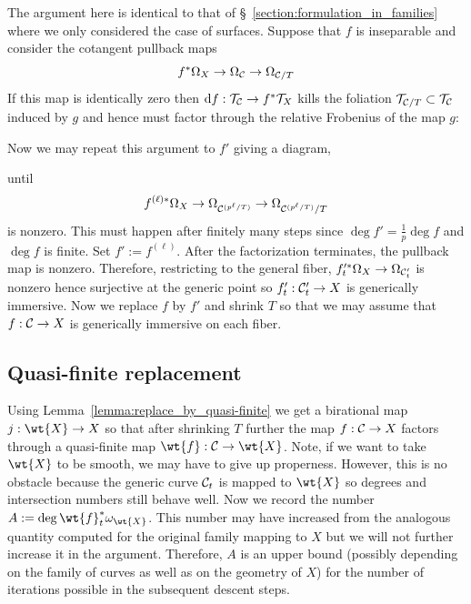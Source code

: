 \documentclass[main.tex]{subfiles}
\begin{document}
{The argument here is identical to that of \S~\ref{section:formulation_in_families} where we only considered the case of surfaces. Suppose that $f$ is inseparable and consider the cotangent pullback maps
\[ f^* \Omega_X \to \Omega_{\mathcal{C}} \to \Omega_{\mathcal{C}/T} \]
If this map is identically zero then $\mathrm{d}{f} : \mathcal{T}_{\mathcal{C}} \to f^* \mathcal{T}_{X}$ kills the foliation $\mathcal{T}_{\mathcal{C}/T} \subset \mathcal{T}_{\mathcal{C}}$ induced by $g$ and hence must factor through the relative Frobenius of the map $g$:
\begin{center}
\end{center}
Now we may repeat this argument to $f'$ giving a diagram,
\begin{center}
\end{center}
until
\[ f^{(\ell)*} \Omega_X \to \Omega_{\mathcal{C}^{(p^{\ell}/T)}} \to \Omega_{\mathcal{C}^{(p^{\ell} / T)}/T} \]
is nonzero. This must happen after finitely many steps since $\deg{f'} = \frac{1}{p} \deg{f}$ and $\deg{f}$ is finite. Set $f' := f^{(\ell)}$. After the factorization terminates, the pullback map is nonzero. Therefore, restricting to the general fiber, $f_t'^* \Omega_X \to \Omega_{\mathcal{C}'_t}$ is nonzero hence surjective at the generic point so $f'_t : \mathcal{C}'_t \to X$ is generically immersive. 
Now we replace $f$ by $f'$ and shrink $T$ so that we may assume that $f : \mathcal{C} \to X$ is generically immersive on each fiber.

\subsection{Quasi-finite replacement}

Using Lemma~\ref{lemma:replace_by_quasi-finite} we get a birational map $j : \wt{X} \to X$ so that after shrinking $T$ further the map $f : \mathcal{C} \to X$ factors through a quasi-finite map $\wt{f} : \cC \to \wt{X}$. Note, if we want to take $\wt{X}$ to be smooth, we may have to give up properness. However, this is no obstacle because the generic curve $\mathcal{C}_t$ is mapped to $\wt{X}$ so degrees and intersection numbers still behave well. Now we record the number $A := \deg{\wt{f}^*_t \omega_{\wt{X}}}$. This number may have increased from the analogous quantity computed for the original family mapping to $X$ but we will not further increase it in the argument. Therefore, $A$ is an upper bound (possibly depending on the family of curves as well as on the geometry of $X$) for the number of iterations possible in the subsequent descent steps.


}
\end{document}
